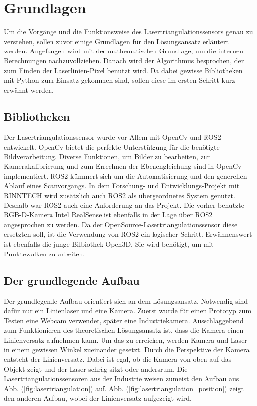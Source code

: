 \section{Grundlagen}\label{grundlagen}
	Um die Vorgänge und die Funktionsweise des Lasertriangulationssensors genau zu verstehen, sollen zuvor einige Grundlagen für den Lösungsansatz erläutert werden. Angefangen wird mit der mathematischen Grundlage, um die internen Berechnungen nachzuvollziehen. Danach wird der Algorithmus besprochen, der zum Finden der Laserlinien-Pixel benutzt wird. Da dabei gewisse Bibliotheken mit Python zum Einsatz gekommen sind, sollen diese im ersten Schritt kurz erwähnt werden.
	
	\subsection{Bibliotheken}
	Der Lasertriangulationssensor wurde vor Allem mit OpenCv und ROS2 entwickelt. OpenCv bietet die perfekte Unterstützung für die benötigte Bildverarbeitung. Diverse Funktionen, um Bilder zu bearbeiten, zur Kamerakalibrierung und zum Errechnen der Ebenengleichung sind in OpenCv implementiert. \newline
	ROS2 kümmert sich um die Automatisierung und den generellen Ablauf eines Scanvorgangs. In dem Forschung- und Entwicklungs-Projekt mit RINNTECH wird zusätzlich auch ROS2 als übergeordnetes System genutzt. Deshalb war ROS2 auch eine Anforderung an das Projekt. Die vorher benutzte RGB-D-Kamera Intel RealSense ist ebenfalls in der Lage über ROS2 angesprochen zu werden. Da der OpenSource-Lasertriangulationssensor diese ersetzten soll, ist die Verwendung von ROS2 ein logischer Schritt. \newline
	Erwähnenswert  ist ebenfalls die junge Bilbiothek Open3D. Sie wird benötigt, um mit Punktewolken zu arbeiten.
	
	\subsection{Der grundlegende Aufbau}
	Der grundlegende Aufbau orientiert sich an dem Lösungsansatz. Notwendig sind dafür nur ein Linienlaser und eine Kamera. Zuerst wurde für einen Prototyp zum Testen eine Webcam verwendet, später eine Industriekamera. Ausschlaggebend zum Funktionieren des theoretischen Lösungsansatz ist, dass die Kamera einen Linienversatz aufnehmen kann. Um das zu erreichen, werden Kamera und Laser in einem gewissen Winkel zueinander gesetzt. Durch die Perspektive der Kamera entsteht der Linienversatz. Dabei ist egal, ob die Kamera von oben auf das Objekt zeigt und der Laser schräg sitzt oder andersrum. Die Lasertriangulationssensoren aus der Industrie weisen zumeist den Aufbau aus Abb. (\ref{fig:lasertriangulation}) auf. Abb. (\ref{fig:lasertriangulation_position}) zeigt den anderen Aufbau, wobei der Linienversatz aufgezeigt wird.
	
